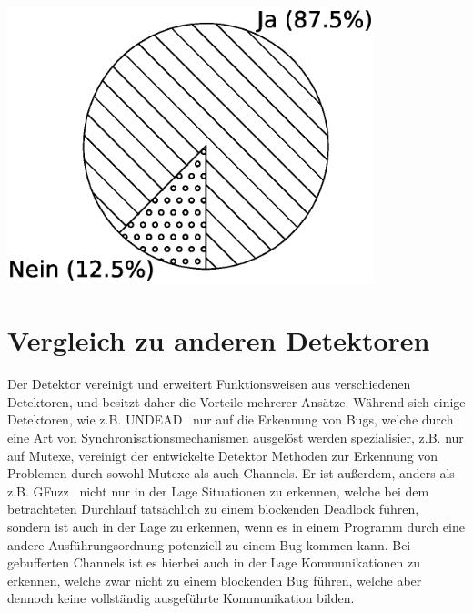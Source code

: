 \hfill
\begin{minipage}{0.45\textwidth}
  \centering
  \includegraphics[width=0.8\textwidth]{img/pi_goker_mix.eps}
  \label{Chap:Eval-Sec:Goker-Fig:Mix}
\end{minipage}

\section{Vergleich zu anderen Detektoren}
Der Detektor vereinigt und erweitert Funktionsweisen aus verschiedenen 
Detektoren, und besitzt daher die Vorteile mehrerer Ansätze. Während sich 
einige Detektoren, wie z.B. UNDEAD~\cite{Undead} nur auf die Erkennung 
von Bugs, welche durch eine Art von Synchronisationsmechanismen ausgelöst werden 
spezialisier, z.B. nur auf Mutexe,
vereinigt der entwickelte Detektor Methoden zur Erkennung von Problemen 
durch sowohl Mutexe als auch Channels. Er ist außerdem, anders als z.B. 
GFuzz~\cite{gfuzz} nicht nur in der Lage Situationen zu erkennen, welche 
bei dem betrachteten Durchlauf tatsächlich zu einem blockenden 
Deadlock führen, sondern ist auch in der Lage zu erkennen, wenn es in einem 
Programm durch eine andere Ausführungsordnung potenziell zu einem 
Bug kommen kann. Bei gebufferten Channels ist es hierbei auch in der Lage
Kommunikationen zu erkennen, welche zwar nicht zu einem blockenden 
Bug führen, welche aber dennoch keine vollständig ausgeführte Kommunikation 
bilden. 